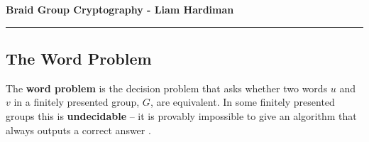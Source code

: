 \documentclass[11pt]{article}
\begin{document}
\begin{center}
{\bf \Large Braid Group Cryptography - Liam Hardiman}
\vspace{0.2cm}
\hrule
\end{center}



\subsection*{The Word Problem}
The \textbf{word problem} is the decision problem that asks whether two words $u$ and $v$ in a finitely presented group, $G$, are equivalent. In some finitely presented groups this is \textbf{undecidable} -- it is provably impossible to give an algorithm that always outputs a correct answer \cite{nov55}.
\end{document}
